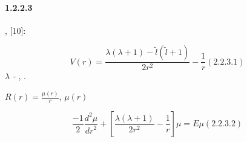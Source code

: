 \documentclass[a4paper]{article}
\begin{document}
\paragraph[1.2.2.3 {\CYRM}{\cyro}{\cyrd}{\cyre}{\cyrl}{\cyrsftsn}{\cyrn}{\cyrery}{\cyrishrt}
{\cyrp}{\cyro}{\cyrt}{\cyre}{\cyrn}{\cyrc}{\cyri}{\cyra}{\cyrl}
{\CYRS}{\cyra}{\cyrishrt}{\cyrm}{\cyro}{\cyrn}{\cyrs}{\cyra} ]{1.2.2.3
{\CYRM}{\cyro}{\cyrd}{\cyre}{\cyrl}{\cyrsftsn}{\cyrn}{\cyrery}{\cyrishrt}
{\cyrp}{\cyro}{\cyrt}{\cyre}{\cyrn}{\cyrc}{\cyri}{\cyra}{\cyrl}
{\CYRS}{\cyra}{\cyrishrt}{\cyrm}{\cyro}{\cyrn}{\cyrs}{\cyra} }
\hypertarget{RefHeading4683463868395}{}{\CYREREV}{\cyrm}{\cyrp}{\cyri}{\cyrr}{\cyri}{\cyrch}{\cyre}{\cyrs}{\cyrk}{\cyri}
{\cyrn}{\cyra}{\cyrb}{\cyrl}{\cyryu}{\cyrd}{\cyra}{\cyre}{\cyrm}{\cyrery}{\cyrishrt}
{\cyrk}{\cyrv}{\cyra}{\cyrn}{\cyrt}{\cyro}{\cyrv}{\cyrery}{\cyrishrt} {\cyrd}{\cyre}{\cyrf}{\cyre}{\cyrk}{\cyrt}
{\cyrm}{\cyro}{\cyrzh}{\cyrn}{\cyro} {\cyru}{\cyrch}{\cyre}{\cyrs}{\cyrt}{\cyrsftsn},
{\cyrr}{\cyra}{\cyrs}{\cyrs}{\cyrm}{\cyra}{\cyrt}{\cyrr}{\cyri}{\cyrv}{\cyra}{\cyrya}
{\cyrm}{\cyro}{\cyrd}{\cyre}{\cyrl}{\cyrsftsn}{\cyrn}{\cyrery}{\cyrishrt}
{\cyrp}{\cyro}{\cyrt}{\cyre}{\cyrn}{\cyrc}{\cyri}{\cyra}{\cyrl}
{\cyrs}{\cyrl}{\cyre}{\cyrd}{\cyru}{\cyryu}{\cyrshch}{\cyre}{\cyrg}{\cyro} {\cyrv}{\cyri}{\cyrd}{\cyra}[10]:

\begin{equation*}
V\left(r\right)=\frac{\lambda \left(\lambda +1\right)-\widetilde l(\widetilde l+1)}{2r^2}-\frac 1 r(2.2.3.1)
\end{equation*}
 $\lambda $\textit{ - }{\cyrp}{\cyra}{\cyrr}{\cyra}{\cyrm}{\cyre}{\cyrt}{\cyrr},
{\cyro}{\cyrp}{\cyrr}{\cyre}{\cyrd}{\cyre}{\cyrl}{\cyrya}{\cyre}{\cyrm}{\cyrery}{\cyrishrt}
{\cyrerev}{\cyrm}{\cyrp}{\cyri}{\cyrr}{\cyri}{\cyrch}{\cyre}{\cyrs}{\cyrk}{\cyri}.

{\CYRV}{\cyrv}{\cyro}{\cyrd}{\cyrya} {\cyrz}{\cyra}{\cyrm}{\cyre}{\cyrn}{\cyru}  $R(r)=\frac{\mu (r)} r$,
{\cyrp}{\cyro}{\cyrl}{\cyru}{\cyrch}{\cyra}{\cyre}{\cyrm}
{\cyru}{\cyrr}{\cyra}{\cyrv}{\cyrn}{\cyre}{\cyrn}{\cyri}{\cyre} {\cyrn}{\cyra}  $\mu (r)$

\begin{equation*}
\frac{-1} 2\frac{d^2\mu }{\mathit{dr}^2}+\left[\frac{\lambda (\lambda +1)}{2r^2}-\frac 1 r\right]\mu =E\mu (2.2.3.2)
\end{equation*}
{\CYRU}{\cyrr}{\cyra}{\cyrv}{\cyrn}{\cyre}{\cyrn}{\cyri}{\cyre}
{\cyri}{\cyrm}{\cyre}{\cyre}{\cyrt}\foreignlanguage{english}{
}{\cyrs}{\cyrl}{\cyre}{\cyrd}{\cyru}{\cyryu}{\cyrshch}{\cyre}{\cyre} {\cyrr}{\cyre}{\cyrsh}{\cyre}{\cyrn}{\cyri}{\cyre}
\end{document}
